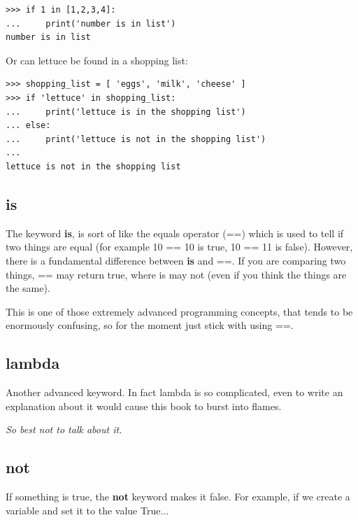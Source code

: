 \begin{listing}
\begin{verbatim}
>>> if 1 in [1,2,3,4]:
...     print('number is in list')
number is in list
\end{verbatim}
\end{listing}

\noindent
Or can lettuce be found in a shopping list:

\begin{listing}
\begin{verbatim}
>>> shopping_list = [ 'eggs', 'milk', 'cheese' ]
>>> if 'lettuce' in shopping_list:
...     print('lettuce is in the shopping list')
... else:
...     print('lettuce is not in the shopping list')
...
lettuce is not in the shopping list
\end{verbatim}
\end{listing}

\subsection*{is}

The keyword \textbf{is}, is sort of like the equals operator (==) which is used to tell if two things are equal (for example 10 == 10 is true, 10 == 11 is false).  However, there is a fundamental difference between \textbf{is} and ==. If you are comparing two things, == may return true, where is may not (even if you think the things are the same). 
\par
This is one of those extremely advanced programming concepts, that tends to be enormously confusing, so for the moment just stick with using ==.

\subsection*{lambda}

Another advanced keyword. In fact lambda is so complicated, even to write an explanation about it would cause this book to burst into flames.
\par
\emph{So best not to talk about it.}

\subsection*{not}

If something is true, the \textbf{not} keyword makes it false.  For example, if we create a variable  and set it to the value True...

